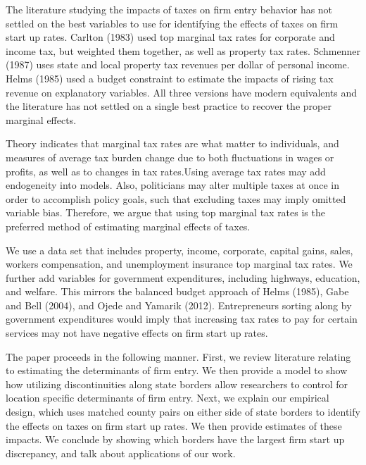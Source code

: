 The literature studying the impacts of taxes on firm entry behavior has not settled on the best variables to use for identifying the effects of taxes on firm start up rates. Carlton (1983) used top marginal tax rates for corporate and income tax, but weighted them together, as well as property tax rates. Schmenner (1987) uses state and local property tax revenues per dollar of personal income. Helms (1985) used a budget constraint to estimate the impacts of rising tax revenue on explanatory variables. All three versions have modern equivalents and the literature has not settled on a single best practice to recover the proper marginal effects.

Theory indicates that marginal tax rates are what matter to individuals, and measures of average tax burden change due to both fluctuations in wages or profits, as well as to changes in tax rates.Using average tax rates may add endogeneity into models. Also, politicians may alter multiple taxes at once in order to accomplish policy goals, such that excluding taxes may imply omitted variable bias. Therefore, we argue that using top marginal tax rates is the preferred method of estimating marginal effects of taxes.

We use a data set that includes property, income, corporate, capital gains, sales, workers compensation, and unemployment insurance top marginal tax rates. We further add variables for government expenditures, including highways, education, and welfare. This mirrors the balanced budget approach of Helms (1985), Gabe and Bell (2004), and  Ojede and Yamarik (2012). Entrepreneurs sorting along by government expenditures would imply that increasing tax rates to pay for certain services may not have negative effects on firm start up rates.

The paper proceeds in the following manner. First, we review literature relating to estimating the determinants of firm entry. We then provide a model to show how utilizing discontinuities along state borders allow researchers to control for location specific determinants of firm entry. Next, we explain our empirical design, which uses matched county pairs on either side of state borders to identify the effects on taxes on firm start up rates. We then provide estimates of these impacts. We conclude by showing which borders have the largest firm start up discrepancy, and talk about applications of our work.